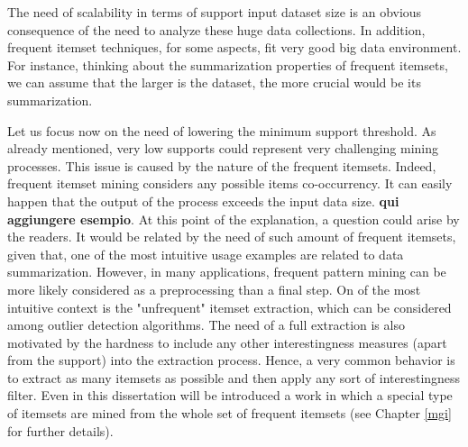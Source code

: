 The need of scalability in terms of support input dataset size is an obvious consequence of the need to analyze these huge data collections. In addition, frequent itemset techniques, for some aspects, fit very good big data environment. For instance, thinking about the summarization properties of frequent itemsets, we can assume that the larger is the dataset, the more crucial would be its summarization.

Let us focus now on the need of lowering the minimum support threshold. As already mentioned, very low supports could represent very challenging mining processes. 
This issue is caused by the nature of the frequent itemsets. Indeed, frequent itemset mining considers any possible items co-occurrency. It can easily happen that the output of the process exceeds the input data size.
\textbf{qui aggiungere esempio}.
At this point of the explanation, a question could arise by the readers. It would be related by the need of such amount of frequent itemsets, given that, one of the most intuitive usage examples are related to data summarization.
However, in many applications, frequent pattern mining can be more likely considered as a preprocessing than a final step. On of the most intuitive context is the "unfrequent" itemset extraction, which can be considered among outlier detection algorithms. The need of a full extraction is also motivated by the hardness to include any other interestingness measures (apart from the support) into the extraction process. Hence, a very common behavior is to extract as many itemsets as possible and then apply any sort of interestingness filter. 
Even in this dissertation will be introduced a work in which a special type of itemsets are mined from the whole set of frequent itemsets (see Chapter \ref{mgi} for further details).

